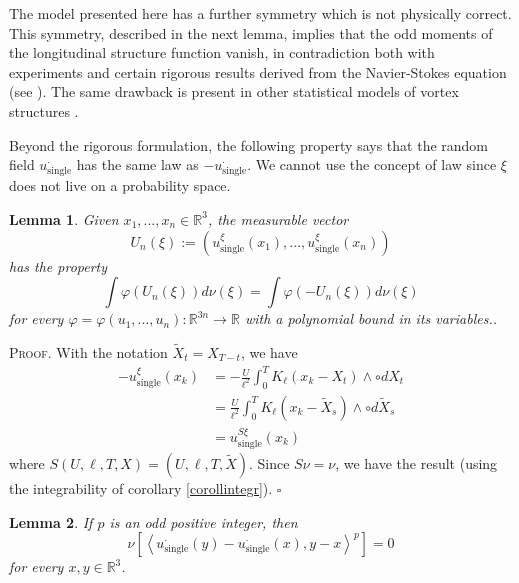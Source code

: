 \documentclass[a4paper,12pt]{article}
\newtheorem{lemma}{Lemma}
\begin{document}
The model presented here has a further symmetry which is not physically
correct. This symmetry, described in the next lemma, implies that the odd
moments of the longitudinal structure function vanish, in contradiction both
with experiments and certain rigorous results derived from the Navier-Stokes
equation (see \cite{frisch}). The same drawback is present in other
statistical models of vortex structures \cite{Pullin}.

Beyond the rigorous formulation, the following property says that the random
field $u_{\text{single}}^{\cdot}$ has the same law as $-u_{\text{single}%
}^{\cdot}$. We cannot use the concept of law since $\xi$ does not live on a
probability space.

\begin{lemma}
Given $x_{1},...,x_{n}\in\mathbb{R}^{3}$, the measurable vector
\[
U_{n}\left(  \xi\right)  :=\left(  u_{\text{single}}^{\xi}\left(
x_{1}\right)  ,...,u_{\text{single}}^{\xi}\left(  x_{n}\right)  \right)
\]
has the property
\[
\int\varphi\left(  U_{n}\left(  \xi\right)  \right)  d\nu\left(  \xi\right)
=\int\varphi\left(  -U_{n}\left(  \xi\right)  \right)  d\nu\left(
\xi\right)
\]
for every $\varphi=\varphi\left(  u_{1},...,u_{n}\right)  :\mathbb{R}%
^{3n}\rightarrow\mathbb{R}$ with a polynomial bound in its variables..
\end{lemma}

\textsc{Proof.}\hspace{0.3cm} With the notation $\widetilde{X}_{t}=X_{T-t}$,
we have
\begin{align*}
-u_{\text{single}}^{\xi}\left(  x_{k}\right)   &  =-\frac{U}{\ell^{2}}\int
_{0}^{T}K_{\ell}(x_{k}-X_{t})\wedge\circ dX_{t}\\
&  =\frac{U}{\ell^{2}}\int_{0}^{T}K_{\ell}(x_{k}-\widetilde{X}_{s})\wedge\circ
d\widetilde{X}_{s}\\
&  =u_{\text{single}}^{S\xi}\left(  x_{k}\right)
\end{align*}
where $S(U,\ell,T,X)=(U,\ell,T,\widetilde{X})$. Since $S\nu=\nu$, we have the
result (using the integrability of corollary \ref{corollintegr}).
\hfill$\square$

\begin{lemma}
\label{reflectsymm}If $p$ is an odd positive integer, then
\[
\nu\left[  \left\langle u_{\text{single}}^{\cdot}\left(  y\right)
-u_{\text{single}}^{\cdot}\left(  x\right)  ,y-x\right\rangle ^{p}\right]  =0
\]
for every $x,y\in\mathbb{R}^{3}$.
\end{lemma}
\end{document}
